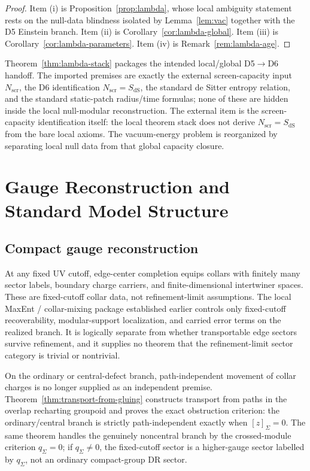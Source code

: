 \documentclass[11pt]{article}
\begin{document}
\begin{proof}
Item \textup{(i)} is Proposition~\ref{prop:lambda}, whose local ambiguity statement rests on the null-data blindness isolated by Lemma~\ref{lem:vac} together with the D5 Einstein branch. Item \textup{(ii)} is Corollary~\ref{cor:lambda-global}. Item \textup{(iii)} is Corollary~\ref{cor:lambda-parameters}. Item \textup{(iv)} is Remark~\ref{rem:lambda-age}.
\end{proof}

Theorem~\ref{thm:lambda-stack} packages the intended local/global D5\(\to\)D6 handoff. The imported premises are exactly the external screen-capacity input \(N_{\mathrm{scr}}\), the D6 identification \(N_{\mathrm{scr}}=S_{\mathrm{dS}}\), the standard de Sitter entropy relation, and the standard static-patch radius/time formulas; none of these are hidden inside the local null-modular reconstruction. The external item is the screen-capacity identification itself: the local theorem stack does not derive \(N_{\mathrm{scr}}=S_{\mathrm{dS}}\) from the bare local axioms. The vacuum-energy problem is reorganized by separating local null data from that global capacity closure.

\section{Gauge Reconstruction and Standard Model Structure}

\subsection{Compact gauge reconstruction}

At any fixed UV cutoff, edge-center completion equips collars with finitely many sector labels, boundary charge carriers, and finite-dimensional intertwiner spaces. These are fixed-cutoff collar data, not refinement-limit assumptions. The local MaxEnt / collar-mixing package established earlier controls only fixed-cutoff recoverability, modular-support localization, and carried error terms on the realized branch. It is logically separate from whether transportable edge sectors survive refinement, and it supplies no theorem that the refinement-limit sector category is trivial or nontrivial.

On the ordinary or central-defect branch, path-independent movement of collar charges is no longer supplied as an independent premise. Theorem~\ref{thm:transport-from-gluing} constructs transport from paths in the overlap recharting groupoid and proves the exact obstruction criterion: the ordinary/central branch is strictly path-independent exactly when \([z]_\Sigma=0\). The same theorem handles the genuinely noncentral branch by the crossed-module criterion \(q_\Sigma=0\); if \(q_\Sigma\ne0\), the fixed-cutoff sector is a higher-gauge sector labelled by \(q_\Sigma\), not an ordinary compact-group DR sector.
\end{document}
